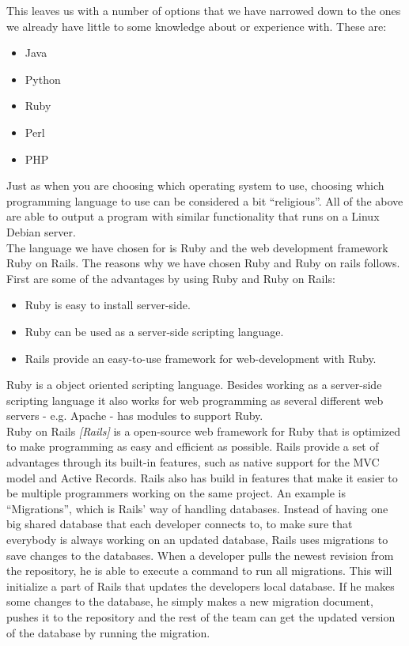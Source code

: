 This leaves us with a number of options that we have narrowed down to the ones we already have little to some knowledge about or experience with. 
These are:
\begin{itemize}
	\item Java
	\item Python
	\item Ruby
	\item Perl
	\item PHP
\end{itemize}

Just as when you are choosing which operating system to use, choosing which programming language to use can be considered a bit ``religious''.
All of the above are able to output a program with similar functionality that runs on a Linux Debian server.\\

The language we have chosen for \projectname{} is Ruby and the web development framework Ruby on Rails.
The reasons why we have chosen Ruby and Ruby on rails follows. 
First are some of the advantages by using Ruby and Ruby on Rails:

\begin{itemize}
	\item Ruby is easy to install server-side.
	\item Ruby can be used as a server-side scripting language.
	\item Rails provide an easy-to-use framework for web-development with Ruby.
\end{itemize}

Ruby is a object oriented scripting language.
Besides working as a server-side scripting language it also works for web programming as several different web servers - e.g. Apache - has modules to support Ruby. \\

Ruby on Rails \emph{[Rails]} is a open-source web framework for Ruby that is optimized to make programming as easy and efficient as possible.
Rails provide a set of advantages through its built-in features, such as native support for the MVC model and Active Records. 
Rails also has build in features that make it easier to be multiple programmers working on the same project.
An example is ``Migrations'', which is Rails' way of handling databases.
Instead of having one big shared database that each developer connects to, to make sure that everybody is always working on an updated database, Rails uses migrations to save changes to the databases.
When a developer pulls the newest revision from the repository, he is able to execute a command to run all migrations.
This will initialize a part of Rails that updates the developers local database.
If he makes some changes to the database, he simply makes a new migration document, pushes it to the repository and the rest of the team can get the updated version of the database by running the migration.\\

